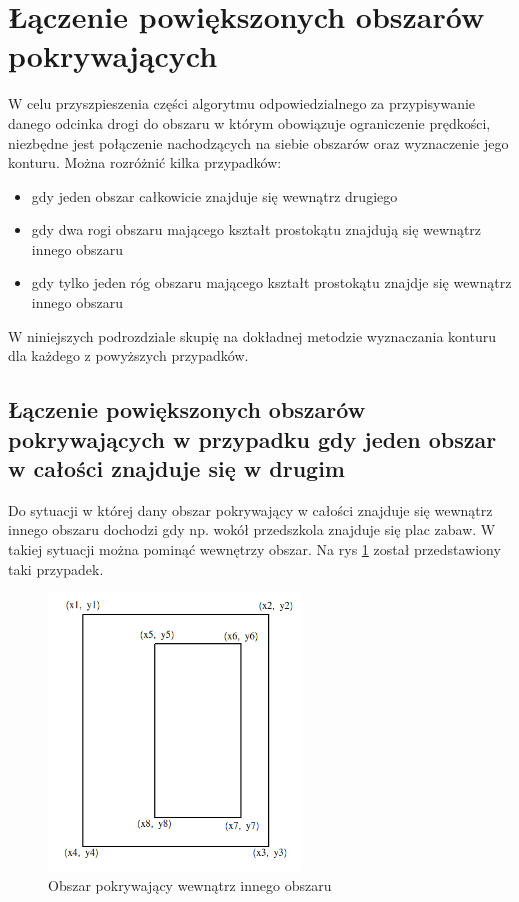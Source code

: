 \newpage
\section{Łączenie powiększonych obszarów pokrywających}
\label{sec:laczeniepowiekszonychobszarwwpokrywajacych}

W celu przyszpieszenia części algorytmu odpowiedzialnego za przypisywanie danego odcinka drogi do obszaru w którym obowiązuje ograniczenie prędkości, niezbędne jest połączenie nachodzących na siebie obszarów oraz wyznaczenie jego konturu. Można rozróżnić kilka przypadków:
\begin{itemize}
\item gdy jeden obszar całkowicie znajduje się wewnątrz drugiego
\item gdy dwa rogi obszaru mającego kształt prostokątu znajdują się wewnątrz innego obszaru
\item gdy tylko jeden róg obszaru mającego kształt prostokątu znajdje się wewnątrz innego obszaru
\end{itemize}
W niniejszych podrozdziale skupię na dokładnej metodzie wyznaczania konturu dla każdego z powyższych przypadków.

\subsection{Łączenie powiększonych obszarów pokrywających w przypadku gdy jeden obszar w całości znajduje się w drugim}

Do sytuacji w której dany obszar pokrywający w całości znajduje się wewnątrz innego obszaru dochodzi gdy np. wokół przedszkola znajduje się plac zabaw. W takiej sytuacji
można pominąć wewnętrzy obszar. Na rys \ref{fig:boundingBoxInside} został przedstawiony taki przypadek.

\begin{figure}[h]
\caption{Obszar pokrywający wewnątrz innego obszaru}
\label{fig:boundingBoxInside}
\centering
\includegraphics[width=0.6\textwidth]{boundingBoxInside}
\end{figure}

